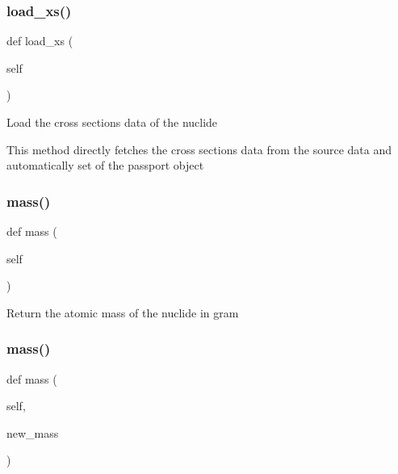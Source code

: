 \subsubsection{\texorpdfstring{load\+\_\+xs()}{load\_xs()}}
{\footnotesize\ttfamily def load\+\_\+xs (\begin{DoxyParamCaption}\item[{}]{self }\end{DoxyParamCaption})}

\begin{DoxyVerb}Load the cross sections data of the nuclide

This method directly fetches the cross sections data from the source data and automatically set
of the passport object\end{DoxyVerb}
 \mbox{\label{classopenbu_1_1passport_1_1_passport_a69ae279139576858c6ca4dc9f5912717}} 
\subsubsection{\texorpdfstring{mass()}{mass()}\hspace{0.1cm}{\footnotesize\ttfamily [1/2]}}
{\footnotesize\ttfamily def mass (\begin{DoxyParamCaption}\item[{}]{self }\end{DoxyParamCaption})}

\begin{DoxyVerb}Return the atomic mass of the nuclide in gram\end{DoxyVerb}
 \mbox{\label{classopenbu_1_1passport_1_1_passport_af9495c31f61c9811206c6941dfa5acdf}} 
\subsubsection{\texorpdfstring{mass()}{mass()}\hspace{0.1cm}{\footnotesize\ttfamily [2/2]}}
{\footnotesize\ttfamily def mass (\begin{DoxyParamCaption}\item[{}]{self,  }\item[{}]{new\+\_\+mass }\end{DoxyParamCaption})}

